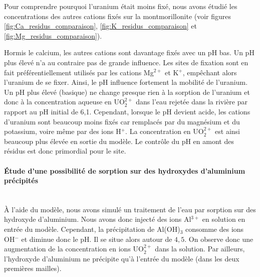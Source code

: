 \documentclass{article}
\begin{document}
Pour comprendre pourquoi l’uranium était moins fixé, nous avons étudié les concentrations des autres cations fixés sur la montmorillonite (voir figures \ref{fig:Ca_residus_comparaison}, \ref{fig:K_residus_comparaison} et \ref{fig:Mg_residus_comparaison}).

Hormis le calcium, les autres cations sont davantage fixés avec un pH bas. Un pH plus élevé n'a au contraire pas de grande influence. Les sites de fixation sont en fait préférentiellement utilisés par les cations Mg$^{2+}$ et K$^{+}$, empêchant alors l’uranium de se fixer.
Ainsi, le pH influence fortement la mobilité de l’uranium. Un pH plus élevé (basique) ne change presque rien à la sorption de l’uranium et donc à la concentration aqueuse en UO$_2^{2+}$ dans l’eau rejetée dans la rivière par rapport au pH initial de 6,1. Cependant, lorsque le pH devient acide, les cations d’uranium sont beaucoup moins fixés car remplacés par du magnésium et du potassium, voire même par des ions H$^{+}$. La concentration en UO$_2^{2+}$ est ainsi beaucoup plus élevée en sortie du modèle. Le contrôle du pH en amont des résidus est donc primordial pour le site.

\paragraph{Étude d'une possibilité de sorption sur des hydroxydes d'aluminium précipités \\ \\}
À l'aide du modèle, nous avons simulé un traitement de l’eau par sorption sur des hydroxyde d’aluminium. Nous avons donc injecté des ions Al$^{3+}$ en solution en entrée du modèle. Cependant, la précipitation de Al(OH)$_3$ consomme des ions OH$^{-}$ et diminue donc le pH. Il se situe alors autour de $4,5$. On observe donc une augmentation de la concentration en ions UO$_2^{2+}$ dans la solution. Par ailleurs, l’hydroxyde d’aluminium ne précipite qu'à l’entrée du modèle (dans les deux premières mailles).
\end{document}
